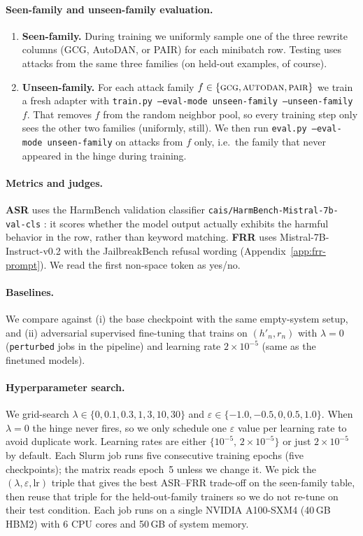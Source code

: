 \documentclass{article}
\begin{document}
\paragraph{Seen-family and unseen-family evaluation.}
\begin{enumerate}[label=(\alph*),leftmargin=*]
\item \textbf{Seen-family.} During training we uniformly sample one of the three rewrite columns (GCG, AutoDAN, or PAIR) for each minibatch row. Testing uses attacks from the same three families (on held-out examples, of course).
\item \textbf{Unseen-family.} For each attack family $f\in\{\textsc{gcg},\textsc{autodan},\textsc{pair}\}$ we train a fresh adapter with \texttt{train.py --eval-mode unseen-family --unseen-family $f$}. That removes $f$ from the random neighbor pool, so every training step only sees the other two families (uniformly, still). We then run \texttt{eval.py --eval-mode unseen-family} on attacks from $f$ only, i.e.\ the family that never appeared in the hinge during training.
\end{enumerate}

\paragraph{Metrics and judges.}
\textbf{ASR} uses the HarmBench validation classifier \texttt{cais/HarmBench-Mistral-7b-val-cls} \citep{mazeika2024harmbench}: it scores whether the model output actually exhibits the harmful behavior in the row, rather than keyword matching. \textbf{FRR} uses Mistral-7B-Instruct-v0.2 \citep{jiang2023mistral} with the JailbreakBench refusal wording \citep{chao2024jailbreakbench} (Appendix~\ref{app:frr-prompt}). We read the first non-space token as yes/no.

\paragraph{Baselines.}
We compare against (i) the base checkpoint with the same empty-system setup, and (ii) adversarial supervised fine-tuning that trains on $(h'_n,r_n)$ with $\lambda{=}0$ (\texttt{perturbed} jobs in the pipeline) and learning rate $2{\times}10^{-5}$ (same as the finetuned models).

\paragraph{Hyperparameter search.}
We grid-search $\lambda\in\{0,0.1,0.3,1,3,10,30\}$ and $\varepsilon\in\{-1.0,-0.5,0,0.5,1.0\}$. When $\lambda{=}0$ the hinge never fires, so we only schedule one $\varepsilon$ value per learning rate to avoid duplicate work. Learning rates are either $\{10^{-5},\,2{\times}10^{-5}\}$ or just $2{\times}10^{-5}$ by default. Each Slurm job runs five consecutive training epochs (five checkpoints); the matrix reads epoch~5 unless we change it. We pick the $(\lambda,\varepsilon,\text{lr})$ triple that gives the best ASR--FRR trade-off on the seen-family table, then reuse that triple for the held-out-family trainers so we do not re-tune on their test condition. Each job runs on a single NVIDIA A100-SXM4 (40\,GB HBM2) with 6 CPU cores and 50\,GB of system memory.
\end{document}
